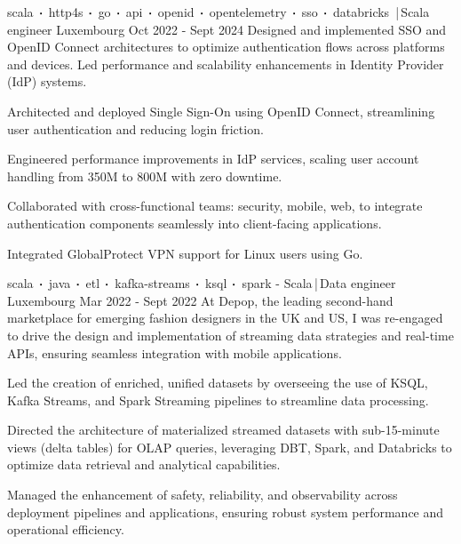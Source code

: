\begin{cventries}
    \cventry
    {scala$\sqbig$http4s$\sqbig$go$\sqbig$api$\sqbig$openid$\sqbig$opentelemetry$\sqbig$sso$\sqbig$databricks}
    {\,|\,Scala engineer}
    {Luxembourg}
    {Oct 2022 - Sept 2024}
    {Designed and implemented SSO and OpenID Connect architectures to optimize authentication flows across platforms and devices. Led performance and scalability enhancements in Identity Provider (IdP) systems.}
    {
        \begin{cvitems}
            \item{Architected and deployed Single Sign-On using OpenID Connect, streamlining user authentication and reducing login friction.}
            \item{Engineered performance improvements in IdP services, scaling user account handling from 350M to 800M with zero downtime.}
            \item{Collaborated with cross-functional teams: security, mobile, web, to integrate authentication components seamlessly into client-facing applications.}
            \item{Integrated GlobalProtect VPN support for Linux users using Go.}
        \end{cvitems}
    }

    \cventry
    {scala$\sqbig$java$\sqbig$etl$\sqbig$kafka-streams$\sqbig$ksql$\sqbig$spark}
    { - Scala\,|\,Data engineer}
    {Luxembourg}
    {Mar 2022 - Sept 2022}
    {At Depop, the leading second-hand marketplace for emerging fashion designers in the UK and US, I was re-engaged to drive the design and implementation of streaming data strategies and real-time APIs, ensuring seamless integration with mobile applications.}
    {
        \begin{cvitems}
            \item{Led the creation of enriched, unified datasets by overseeing the use of KSQL, Kafka Streams, and Spark Streaming pipelines to streamline data processing.}
            \item{Directed the architecture of materialized streamed datasets with sub-15-minute views (delta tables) for OLAP queries, leveraging DBT, Spark, and Databricks to optimize data retrieval and analytical capabilities.}
            \item{Managed the enhancement of safety, reliability, and observability across deployment pipelines and applications, ensuring robust system performance and operational efficiency.}
        \end{cvitems}
    }


\end{cventries}
